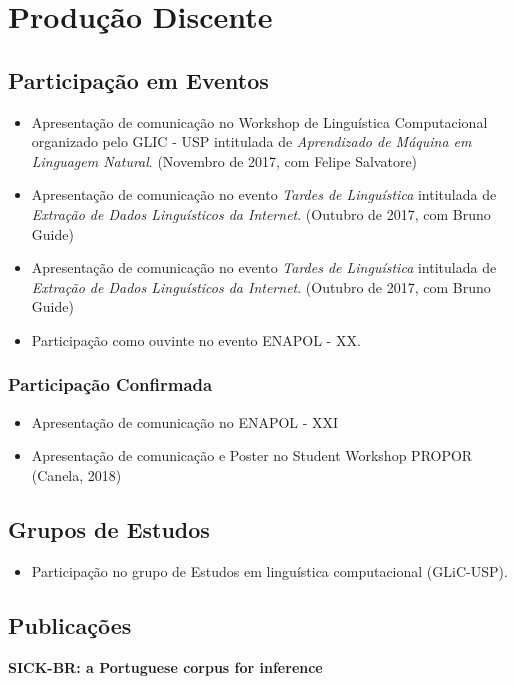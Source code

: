 \chapter{Produção Discente}
\label{ch:02-atividadesacademicas}

\section{Participação em Eventos}
\begin{itemize}
\item Apresentação de comunicação no Workshop de Linguística Computacional organizado pelo GLIC - USP intitulada de \textit{Aprendizado de Máquina em Linguagem Natural}. (Novembro de 2017, com Felipe Salvatore)
\item Apresentação de comunicação no evento \textit{Tardes de Linguística} intitulada de \textit{Extração de Dados Linguísticos da Internet}. (Outubro de 2017, com Bruno Guide)
\item Apresentação de comunicação no evento \textit{Tardes de Linguística} intitulada de \textit{Extração de Dados Linguísticos da Internet}. (Outubro de 2017, com Bruno Guide)
\item Participação como ouvinte no evento ENAPOL - XX.
\end{itemize}

\subsection{Participação Confirmada}
\begin{itemize}
\item Apresentação de comunicação no ENAPOL - XXI
\item Apresentação de comunicação e Poster no Student Workshop PROPOR (Canela, 2018)
\end{itemize}

\section{Grupos de Estudos}
\begin{itemize}
\item Participação no grupo de Estudos em linguística computacional (GLiC-USP).
\end{itemize}
\section{Publicações}
\textbf{SICK-BR: a Portuguese corpus for inference}\\


